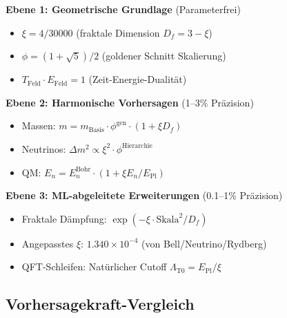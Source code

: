 	\begin{tcolorbox}[colback=blue!5!white,colframe=blue!75!black,title={T0-Theoriestruktur}]
		\textbf{Ebene 1: Geometrische Grundlage} (Parameterfrei)
		\begin{itemize}
			\item $\xi = 4/30000$ (fraktale Dimension $D_f=3-\xi$)
			\item $\phi = (1+\sqrt{5})/2$ (goldener Schnitt Skalierung)
			\item $T_{\text{Feld}} \cdot E_{\text{Feld}} = 1$ (Zeit-Energie-Dualität)
		\end{itemize}
		
		\textbf{Ebene 2: Harmonische Vorhersagen} (1--3\% Präzision)
		\begin{itemize}
			\item Massen: $m = m_{\text{Basis}} \cdot \phi^{\text{gen}} \cdot (1 + \xi D_f)$
			\item Neutrinos: $\Delta m^2 \propto \xi^2 \cdot \phi^{\text{Hierarchie}}$
			\item QM: $E_n = E_n^{\text{Bohr}} \cdot (1 + \xi E_n/E_{\text{Pl}})$
		\end{itemize}
		
		\textbf{Ebene 3: ML-abgeleitete Erweiterungen} (0.1--1\% Präzision)
		\begin{itemize}
			\item Fraktale Dämpfung: $\exp(-\xi \cdot \text{Skala}^2/D_f)$
			\item Angepasstes $\xi$: $1.340\times10^{-4}$ (von Bell/Neutrino/Rydberg)
			\item QFT-Schleifen: Natürlicher Cutoff $\Lambda_{\text{T0}} = E_{\text{Pl}}/\xi$
		\end{itemize}
	\end{tcolorbox}
	
	\subsection{Vorhersagekraft-Vergleich}
	
